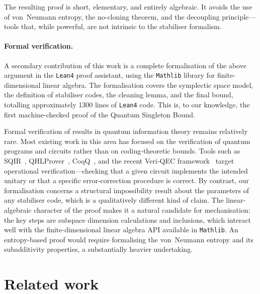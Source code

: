 \documentclass[11pt]{article}
\theoremstyle{plain}
\theoremstyle{definition}
\begin{document}
The resulting proof is short, elementary, and entirely algebraic.  It avoids
the use of von~Neumann entropy, the no-cloning theorem, and the decoupling
principle---tools that, while powerful, are not intrinsic to the stabiliser formalism.

\paragraph{Formal verification.}
A secondary contribution of this work is a complete formalisation of the above argument in the
\texttt{Lean4} proof assistant, using the \texttt{Mathlib} library for finite-dimensional
linear algebra.  The formalisation covers the symplectic space model, the definition of
stabiliser codes, the cleaning lemma, and the final bound, totalling approximately 1300 lines
of \texttt{Lean4} code.  This is, to our knowledge, the first machine-checked proof of the
Quantum Singleton Bound.

Formal verification of results in quantum information theory remains relatively rare.  Most
existing work in this area has focused on the verification of quantum programs and circuits
rather than on coding-theoretic bounds.  Tools such as
SQIR~\cite{SQIR2021}, QHLProver~\cite{QHLProver2019}, CoqQ~\cite{CoqQ2023}, and the recent
Veri-QEC framework~\cite{VeriQEC2025} target operational verification---checking that a given
circuit implements the intended unitary or that a specific error-correction procedure is
correct.  By contrast, our formalisation concerns a structural impossibility result about the
parameters of any stabiliser code, which is a qualitatively different kind of claim.  The
linear-algebraic character of the proof makes it a natural candidate for mechanisation:
the key steps are subspace dimension calculations and inclusions, which interact well with the
finite-dimensional linear algebra API available in \texttt{Mathlib}.  An entropy-based proof
would require formalising the von~Neumann entropy and its subadditivity properties, a
substantially heavier undertaking.


\section{Related work}\label{sec:related}
\end{document}
